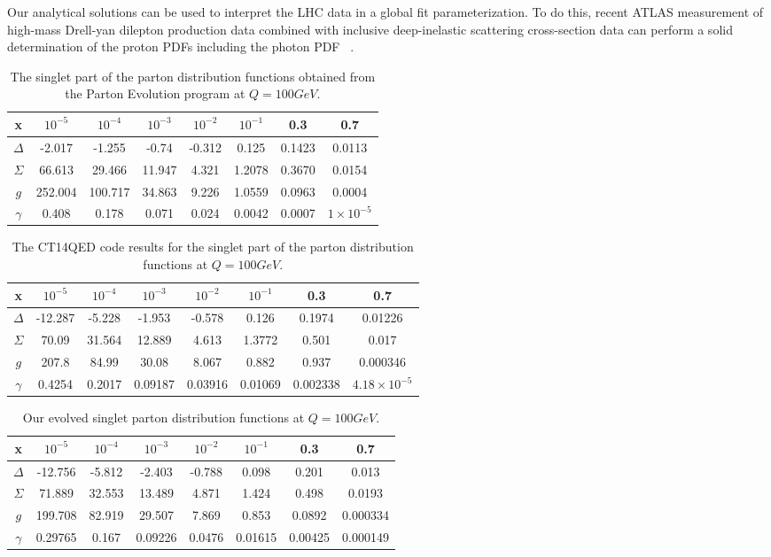 \documentclass[review]{elsarticle}
\begin{document}
Our analytical solutions can be used to interpret the LHC data in a global fit parameterization. To do this, recent ATLAS measurement of high-mass Drell-yan dilepton production data combined with inclusive deep-inelastic scattering cross-section data can perform a solid determination of the proton PDFs including the photon PDF ~\cite{Giuli:2017oii}.
\begin{table*}
\caption{The singlet part of the parton distribution functions obtained from the Parton Evolution program \cite{Roth:2004ti} at $Q=100GeV$.}
\centering{}%
\begin{tabular}{cccccccc}
\hline
x & $10^{-5}$ & $10^{-4}$ & $10^{-3}$ & $10^{-2}$ & $10^{-1}$ & 0.3 & 0.7\tabularnewline
\hline
\hline
$\Delta$ & -2.017 & -1.255 & -0.74 & -0.312 & 0.125 & 0.1423 & 0.0113\tabularnewline
$\Sigma$ & 66.613 & 29.466 & 11.947 & 4.321 & 1.2078 & 0.3670 & 0.0154\tabularnewline
$ g$ & 252.004 & 100.717 & 34.863 & 9.226 & 1.0559 & 0.0963 & 0.0004\tabularnewline
$\gamma$ & 0.408 & 0.178 & 0.071 & 0.024 & 0.0042 & 0.0007 & $1\times10^{-5}$\tabularnewline
\hline
\end{tabular}
\label{table5}
\end{table*}

\begin{table*}
\caption{The CT14QED code \cite{Schmidt:2015zda} results for the singlet part of the parton distribution functions at $Q=100GeV$.}
\centering{}%
\begin{tabular}{cccccccc}
\hline
x & $10^{-5}$ & $10^{-4}$ & $10^{-3}$ & $10^{-2}$ & $10^{-1}$ & 0.3 & 0.7\tabularnewline
\hline
\hline
$\Delta$ & -12.287 & -5.228 & -1.953 & -0.578 & 0.126 & 0.1974 & 0.01226\tabularnewline
$\Sigma$ & 70.09 & 31.564 & 12.889 & 4.613 & 1.3772 & 0.501 & 0.017\tabularnewline
$ g$ & 207.8 & 84.99 & 30.08 & 8.067 & 0.882 & 0.937 & 0.000346\tabularnewline
$\gamma$ & 0.4254 & 0.2017 & 0.09187 & 0.03916 & 0.01069 & 0.002338 & $4.18\times10^{-5}$\tabularnewline
\hline
\end{tabular}
\label{table6}
\end{table*}
\begin{table*}
\caption{Our evolved singlet parton distribution functions at  $Q=100GeV$.}
\centering{}%
\begin{tabular}{cccccccc}
\hline
x & $10^{-5}$ & $10^{-4}$ & $10^{-3}$ & $10^{-2}$ & $10^{-1}$ & 0.3 & 0.7\tabularnewline
\hline
\hline
$\Delta$ & -12.756 & -5.812 & -2.403 & -0.788 & 0.098 & 0.201 &0.013\tabularnewline
$\Sigma$ &71.889 & 32.553 &13.489 & 4.871 &1.424 & 0.498 & 0.0193\tabularnewline
$ g$ & 199.708 &82.919 &29.507 &7.869&0.853 &0.0892 & 0.000334\tabularnewline
$\gamma$ &0.29765 & 0.167 & 0.09226&0.0476 & 0.01615 & 0.00425 & 0.000149 \tabularnewline
\hline
\end{tabular}
\label{table7}
\end{table*}
\end{document}
